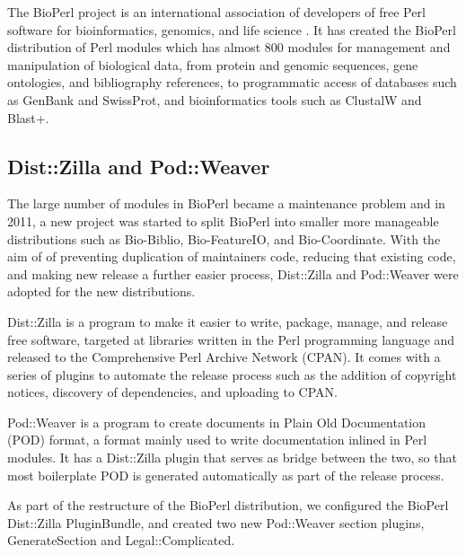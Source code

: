 The BioPerl project is an international association of developers of
free Perl software for bioinformatics, genomics, and life science
\citep{bioperl}.  It has created the BioPerl distribution of Perl
modules which has almost 800 modules for management and manipulation
of biological data, from protein and genomic sequences, gene
ontologies, and bibliography references, to programmatic access of
databases such as GenBank and SwissProt, and bioinformatics tools such
as ClustalW and Blast+.


\subsection{Dist::Zilla and Pod::Weaver}

The large number of modules in BioPerl became a maintenance problem
and in 2011, a new project was started to split BioPerl into smaller
more manageable distributions such as Bio-Biblio, Bio-FeatureIO, and
Bio-Coordinate.  With the aim of of preventing duplication of
maintainers code, reducing that existing code, and making new release
a further easier process, Dist::Zilla and Pod::Weaver were adopted for
the new distributions.

Dist::Zilla is a program to make it easier to write, package, manage,
and release free software, targeted at libraries written in the Perl
programming language and released to the Comprehensive Perl Archive
Network (CPAN).  It comes with a series of plugins to automate the
release process such as the addition of copyright notices, discovery
of dependencies, and uploading to CPAN.

Pod::Weaver is a program to create documents in Plain Old
Documentation (POD) format, a format mainly used to write
documentation inlined in Perl modules.  It has a Dist::Zilla plugin
that serves as bridge between the two, so that most boilerplate POD is
generated automatically as part of the release process.

As part of the restructure of the BioPerl distribution, we configured
the BioPerl Dist::Zilla PluginBundle, and created two new Pod::Weaver
section plugins, GenerateSection and Legal::Complicated.

